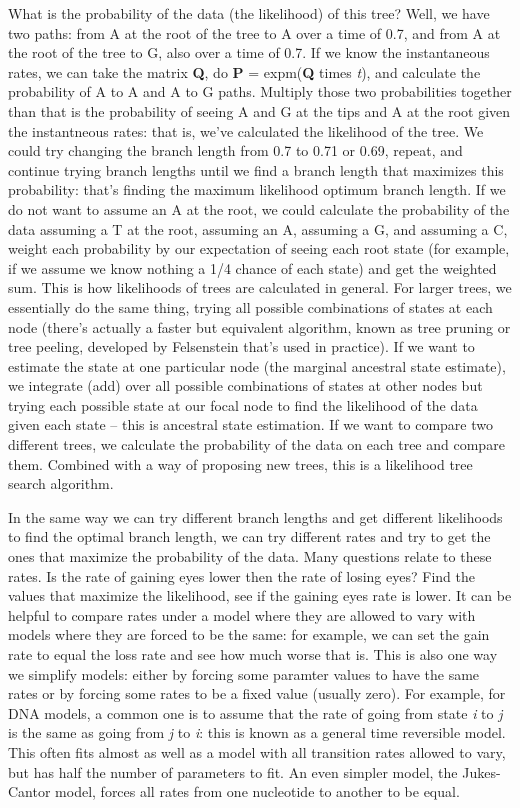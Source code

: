 \documentclass[]{article}
\theoremstyle{definition}
\theoremstyle{definition}
\theoremstyle{definition}
\theoremstyle{remark}
\begin{document}
What is the probability of the data (the likelihood) of this tree? Well,
we have two paths: from A at the root of the tree to A over a time of
0.7, and from A at the root of the tree to G, also over a time of 0.7.
If we know the instantaneous rates, we can take the matrix \textbf{Q},
do \textbf{P} = expm(\textbf{Q} times \emph{t}), and calculate the
probability of A to A and A to G paths. Multiply those two probabilities
together than that is the probability of seeing A and G at the tips and
A at the root given the instantneous rates: that is, we've calculated
the likelihood of the tree. We could try changing the branch length from
0.7 to 0.71 or 0.69, repeat, and continue trying branch lengths until we
find a branch length that maximizes this probability: that's finding the
maximum likelihood optimum branch length. If we do not want to assume an
A at the root, we could calculate the probability of the data assuming a
T at the root, assuming an A, assuming a G, and assuming a C, weight
each probability by our expectation of seeing each root state (for
example, if we assume we know nothing a 1/4 chance of each state) and
get the weighted sum. This is how likelihoods of trees are calculated in
general. For larger trees, we essentially do the same thing, trying all
possible combinations of states at each node (there's actually a faster
but equivalent algorithm, known as tree pruning or tree peeling,
developed by Felsenstein that's used in practice). If we want to
estimate the state at one particular node (the marginal ancestral state
estimate), we integrate (add) over all possible combinations of states
at other nodes but trying each possible state at our focal node to find
the likelihood of the data given each state -- this is ancestral state
estimation. If we want to compare two different trees, we calculate the
probability of the data on each tree and compare them. Combined with a
way of proposing new trees, this is a likelihood tree search algorithm.

In the same way we can try different branch lengths and get different
likelihoods to find the optimal branch length, we can try different
rates and try to get the ones that maximize the probability of the data.
Many questions relate to these rates. Is the rate of gaining eyes lower
then the rate of losing eyes? Find the values that maximize the
likelihood, see if the gaining eyes rate is lower. It can be helpful to
compare rates under a model where they are allowed to vary with models
where they are forced to be the same: for example, we can set the gain
rate to equal the loss rate and see how much worse that is. This is also
one way we simplify models: either by forcing some paramter values to
have the same rates or by forcing some rates to be a fixed value
(usually zero). For example, for DNA models, a common one is to assume
that the rate of going from state \emph{i} to \emph{j} is the same as
going from \emph{j} to \emph{i}: this is known as a general time
reversible model. This often fits almost as well as a model with all
transition rates allowed to vary, but has half the number of parameters
to fit. An even simpler model, the Jukes-Cantor model, forces all rates
from one nucleotide to another to be equal.
\end{document}
